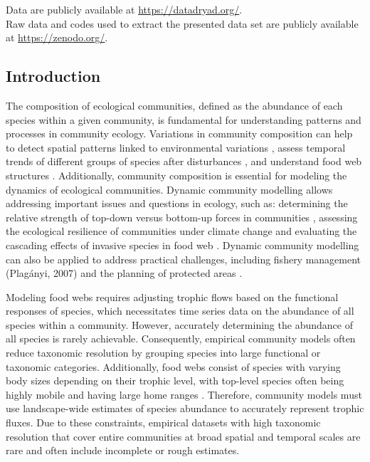 \documentclass[a4paper,twoside,12pt]{article}
\begin{document}
Data are publicly available at \url{https://datadryad.org/}.\\[1.5em]
Raw data and codes used to extract the presented data set are publicly available at \url{https://zenodo.org/}.
\endgroup
\newpage


\subsection*{Introduction}
 The composition of ecological communities, defined as the abundance of each species within a given community, is fundamental for understanding patterns and processes in community ecology. Variations in community composition can help to detect spatial patterns linked to environmental variations \citep{kemp1990}, assess temporal trends of different groups of species after disturbances \citep{philippi1998, magurran2007}, and understand food web structures \citep{cohen2003}. Additionally, community composition is essential for modeling the dynamics of ecological communities. Dynamic community modelling allows addressing important issues and questions in ecology, such as: determining the relative strength of top-down versus bottom-up forces in communities \citep{krebs2003,legagneux2014}, assessing the ecological resilience of communities under climate change \citep{griffith2019} and evaluating the cascading effects of invasive species in food web \citep{david2017, goto2020}. Dynamic community modelling can also be applied to address practical challenges, including fishery management (Plagányi, 2007) and the planning of protected areas \citep{okey2004, dahood2020}. 

Modeling food webs requires adjusting trophic flows based on the functional responses of species, which necessitates time series data on the abundance of all species within a community. However, accurately determining the abundance of all species is rarely achievable. Consequently, empirical community models often reduce taxonomic resolution by grouping species into large functional or taxonomic categories. Additionally, food webs consist of species with varying body sizes depending on their trophic level, with top-level species often being highly mobile and having large home ranges \citep{mccann2005}. Therefore, community models must use landscape-wide estimates of species abundance to accurately represent trophic fluxes. Due to these constraints, empirical datasets with high taxonomic resolution that cover entire communities at broad spatial and temporal scales are rare and often include incomplete or rough estimates.
\end{document}
